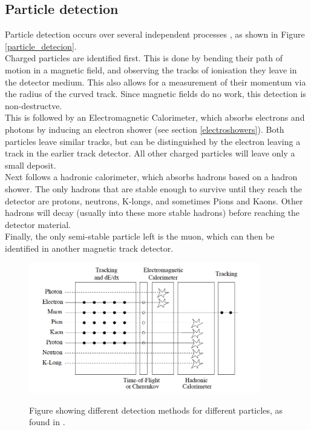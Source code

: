 \documentclass[12 pt]{article}
\begin{document}
		\subsection{Particle detection}
			Particle detection occurs over several independent processes \cite{notes13}, as shown in Figure \ref{particle_detecion}. \\
			Charged particles are identified first. This is done by bending their path of motion in a magnetic field, and observing the tracks of ionisation they leave in the detector medium. This also allows for a measurement of their momentum via the radius of the curved track. Since magnetic fields do no work, this detection is non-destructve. \\
		    This is followed by an Electromagnetic Calorimeter, which absorbs electrons and photons by inducing an electron shower (see section \ref{electroshowers}). Both particles leave similar tracks, but can be distinguished by the electron leaving a track in the earlier track detector. All other charged particles will leave only a small deposit. \\
			Next follows a hadronic calorimeter, which absorbs hadrons based on a hadron shower. The only hadrons that are stable enough to survive until they reach the detector are protons, neutrons, K-longs, and sometimes Pions and Kaons. Other hadrons will decay (usually into these more stable hadrons) before reaching the detector material. \\
			Finally, the only semi-stable particle left is the muon, which can then be identified in another magnetic track detector.


			\begin{figure}[H]
				\centering
				\includegraphics[width=0.9\textwidth]{particle_detection.png}
				\label{particle_detection}
				\caption{Figure showing different detection methods for different particles, as found in \cite{notes13}.}
			\end{figure}
\end{document}
